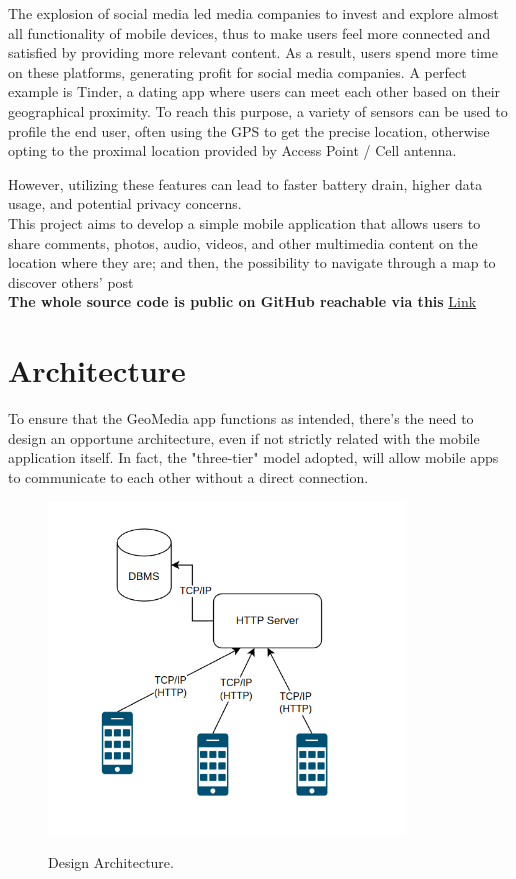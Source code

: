 \documentclass[conference]{IEEEtran}
\begin{document}
The explosion of social media led media companies to invest and explore almost all functionality of mobile devices, thus to make users feel more connected and satisfied by providing more relevant content. As a result, users spend more time on these platforms, generating profit for social media companies.
A perfect example is Tinder, a dating app where users can meet each other based on their geographical proximity.
To reach this purpose, a variety of sensors can be used to profile the end user, often using the GPS to get the precise location, otherwise opting to the proximal location provided by Access Point / Cell antenna.

However, utilizing these features can lead to faster battery drain, higher data usage, and potential privacy concerns.
\\
This project aims to develop a simple mobile application that allows users to share comments, photos, audio, videos, and other multimedia content on the location where they are; and then, the possibility to navigate through a map to discover others' post
\\
\textbf{The whole source code is public on GitHub reachable via this} \href{https://github.com/albertomorini/GeoMedia}{Link}


\section{Architecture}


To ensure that the GeoMedia app functions as intended, there's the need to design an opportune architecture, even if not strictly related with the mobile application itself.
In fact, the "three-tier" model adopted, will allow mobile apps to communicate to each other without a direct connection.

\begin{figure}[htbp]
{\includegraphics[width=9.5cm]{imgs/Architecture.png}}
\caption{Design Architecture.}
\label{fig}
\end{figure}
\end{document}
